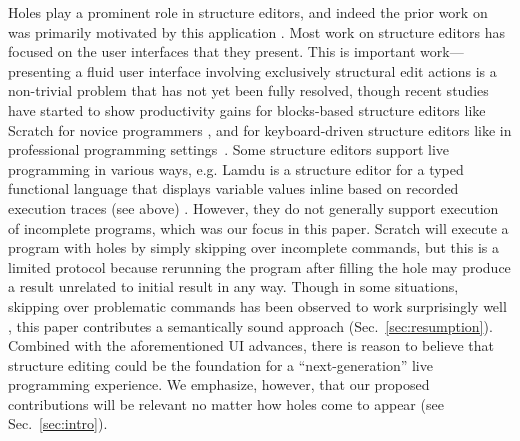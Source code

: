 Holes play a prominent role in structure editors, and indeed the prior work on \Hazelnut was primarily motivated by this application \cite{popl-paper}. 
Most work on structure editors has focused on the user interfaces that they
present. This is important work---presenting a fluid user interface involving
exclusively structural edit actions is a non-trivial problem that has not yet
been fully resolved, though recent studies have started to show productivity
gains for blocks-based structure editors like Scratch for novice programmers \cite{Resnick:2009:SP:1592761.1592779,DBLP:conf/chi/WeintropASFLSF18,DBLP:conf/acmidc/WeintropW15}, and for keyboard-driven structure
editors like  in professional programming settings~\cite{DBLP:conf/vl/Asenov014,DBLP:conf/sle/VolterSBK14,voelter_mbeddr:_2012}. 
Some structure editors support live programming in various ways, e.g. Lamdu is a structure editor for a typed functional language that displays variable values inline based on recorded execution traces (see above) \cite{lamdu}. However, they do not generally support execution of incomplete programs, which was our focus in this paper. Scratch will execute a program with holes by simply skipping over incomplete commands, but this is a limited protocol because rerunning the program after filling the hole may produce a result unrelated to initial result in any way. Though in some situations, skipping over problematic commands has been observed to work surprisingly well \cite{DBLP:conf/dac/Rinard12}, this paper contributes a semantically sound approach (Sec.~\ref{sec:resumption}). Combined with the aforementioned UI advances, there is reason to believe that structure editing could be the foundation for a ``next-generation'' live programming experience. We emphasize, however,   
that our proposed contributions will be relevant no matter how holes come to appear (see Sec.~\ref{sec:intro}). %






